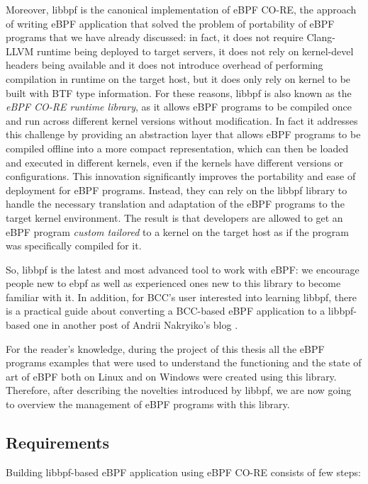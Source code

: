 Moreover, libbpf is the canonical implementation of eBPF CO-RE, the approach of writing eBPF application that solved the problem of portability of eBPF programs that we have already discussed: in fact, it does not require Clang-LLVM runtime being deployed to target servers, it does not rely on kernel-devel headers being available and it does not introduce overhead of performing compilation in runtime on the target host, but it does only rely on kernel to be built with BTF type information.
For these reasons, libbpf is also known as the \textit{eBPF CO-RE runtime library}, as it allows eBPF programs to be compiled once and run across different kernel versions without modification.
In fact it addresses this challenge by providing an abstraction layer that allows eBPF programs to be compiled offline into a more compact representation, which can then be loaded and executed in different kernels, even if the kernels have different versions or configurations.
This innovation significantly improves the portability and ease of deployment for eBPF programs.
Instead, they can rely on the libbpf library to handle the necessary translation and adaptation of the eBPF programs to the target kernel environment.
The result is that developers are allowed to get an eBPF program \textit{custom tailored} to a kernel on the target host as if the program was specifically compiled for it.

So, libbpf is the latest and most advanced tool to work with eBPF: we encourage people new to ebpf as well as experienced ones new to this library to become familiar with it.
In addition, for BCC's user interested into learning libbpf, there is a practical guide about converting a BCC-based eBPF application to a libbpf-based one in another post of Andrii Nakryiko's blog \cite{BCCTolibbpfGuide}.

For the reader's knowledge, during the project of this thesis all the eBPF programs examples that were used to understand the functioning and the state of art of eBPF both on Linux and on Windows were created using this library.
Therefore, after describing the novelties introduced by libbpf, we are now going to overview the management of eBPF programs with this library.

\subsection{Requirements}

Building libbpf-based eBPF application using eBPF CO-RE consists of few steps:

